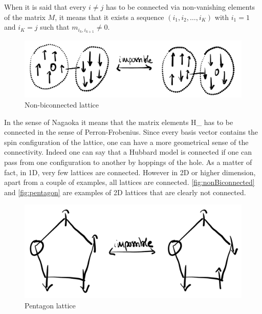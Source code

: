         When it is said that every $i\neq j$ has to be connected via non-vanishing elements of the matrix $M$, it means that it exists a sequence $(i_1,i_2,\dotsc,i_K)$ with $i_1=1$ and $i_K=j$ such that $m_{i_k,i_{k+1}} \neq 0$.

        \begin{figure}[h!]
            \centering
            \includegraphics[scale=0.2]{graphs/nonBiconnected.png}
            \caption{Non-biconnected lattice}
            \label{fig:nonBiconnected}
        \end{figure}

        In the sense of Nagaoka it means that the matrix elements 
        \be {}\mc H_ \ee
        has to be connected in the sense of Perron-Frobenius. Since every basis vector contains the spin configuration of the lattice, one can have a more geometrical sense of the connectivity. Indeed one can say that a Hubbard model is connected if one can pass from one configuration to another by hoppings of the hole. As a matter of fact, in 1D, very few lattices are connected. However in 2D or higher dimension, apart from a couple of examples, all lattices are connected. \autoref{fig:nonBiconnected} and \autoref{fig:pentagon} are examples of 2D lattices that are clearly not connected.\\

        \begin{figure}[h!]
            \centering
            \includegraphics[scale=0.15]{graphs/pentagon.png}
            \caption{Pentagon lattice}
            \label{fig:pentagon}
        \end{figure}
     

